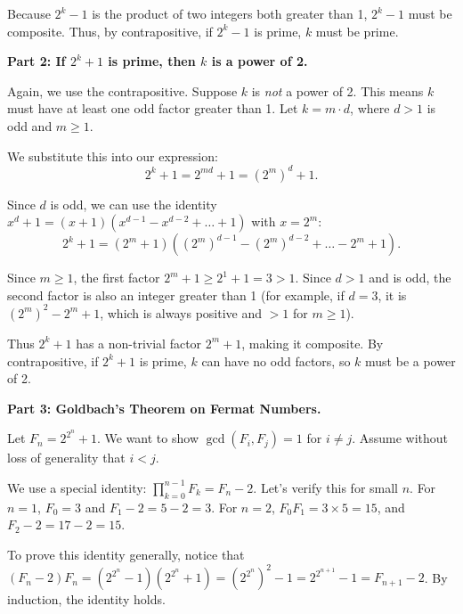 \begin{solution}
\bigskip

Because $2^k - 1$ is the product of two integers both greater than 1, $2^k - 1$ must be composite. Thus, by contrapositive, if $2^k - 1$ is prime, $k$ must be prime.

\bigskip

\textbf{Part 2: If $2^k + 1$ is prime, then $k$ is a power of 2.}

Again, we use the contrapositive. Suppose $k$ is \textit{not} a power of 2. This means $k$ must have at least one odd factor greater than 1. Let $k = m \cdot d$, where $d > 1$ is odd and $m \geq 1$.

\bigskip

We substitute this into our expression:
\[ 2^k + 1 = 2^{md} + 1 = (2^m)^d + 1. \]

\bigskip

Since $d$ is odd, we can use the identity $x^d + 1 = (x+1)(x^{d-1} - x^{d-2} + \dots + 1)$ with $x = 2^m$:
\[ 2^k + 1 = (2^m + 1)( (2^m)^{d-1} - (2^m)^{d-2} + \dots - 2^m + 1). \]

\bigskip

Since $m \geq 1$, the first factor $2^m + 1 \geq 2^1 + 1 = 3 > 1$. Since $d > 1$ and is odd, the second factor is also an integer greater than 1 (for example, if $d=3$, it is $(2^m)^2 - 2^m + 1$, which is always positive and $>1$ for $m \geq 1$).

\bigskip

Thus $2^k + 1$ has a non-trivial factor $2^m + 1$, making it composite. By contrapositive, if $2^k + 1$ is prime, $k$ can have no odd factors, so $k$ must be a power of 2.

\bigskip

\textbf{Part 3: Goldbach's Theorem on Fermat Numbers.}

Let $F_n = 2^{2^n} + 1$. We want to show $\gcd(F_i, F_j) = 1$ for $i \neq j$. Assume without loss of generality that $i < j$.

\bigskip

We use a special identity: $\prod_{k=0}^{n-1} F_k = F_n - 2$. Let's verify this for small $n$. For $n=1$, $F_0 = 3$ and $F_1 - 2 = 5 - 2 = 3$. For $n=2$, $F_0 F_1 = 3 \times 5 = 15$, and $F_2 - 2 = 17 - 2 = 15$.

\bigskip

To prove this identity generally, notice that $(F_n - 2)F_n = (2^{2^n} - 1)(2^{2^n} + 1) = (2^{2^n})^2 - 1 = 2^{2^{n+1}} - 1 = F_{n+1} - 2$. By induction, the identity holds.

\bigskip


\end{solution}
